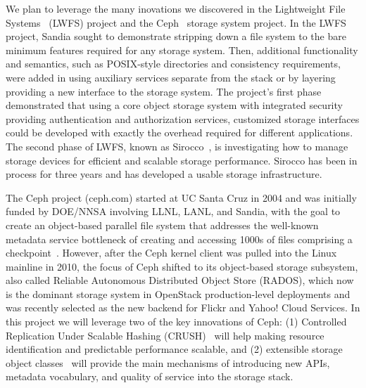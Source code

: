 We plan to leverage the many inovations we discovered in the Lightweight File
Systems~\cite{oldfield:lwfs} (LWFS) project and the Ceph~\cite{weil:osdi06} storage
system project.  In the LWFS project, Sandia sought to demonstrate stripping
down a file system to the bare minimum features required for any storage
system. Then, additional functionality and semantics, such as POSIX-style
directories and consistency requirements, were added in using auxiliary
services separate from the stack or by layering providing a new interface to
the storage system. The project's first phase demonstrated that using a core
object storage system with integrated security providing authentication and
authorization services, customized storage interfaces could be developed with
exactly the overhead required for different applications. The second phase of
LWFS, known as Sirocco~\cite{sirocco}, is investigating how to manage storage
devices for efficient and scalable storage performance.  Sirocco has been in
process for three years and has developed a usable storage infrastructure.

The Ceph project (ceph.com) started at UC Santa Cruz in 2004 and was initially
funded by DOE/NNSA involving LLNL, LANL, and Sandia, with the goal to create an
object-based parallel file system that addresses the well-known metadata
service bottleneck of creating and accessing 1000s of files comprising a
checkpoint~\cite{weil:osdi06}.  However, after the Ceph kernel client was
pulled into the Linux mainline in 2010, the focus of Ceph shifted to its
object-based storage subsystem, also called Reliable Autonomous Distributed
Object Store (RADOS), which now is the dominant storage system in OpenStack
production-level deployments and was recently selected as the new backend for
Flickr and Yahoo! Cloud Services. In this project we will leverage two of the
key innovations of Ceph: (1) Controlled Replication Under Scalable Hashing
(CRUSH)~\cite{weil:sc06} will help making resource identification and
predictable performance scalable, and (2) extensible storage object
classes~\cite{watkins:ucsctr15} will provide the main mechanisms of introducing
new APIs, metadata vocabulary, and quality of service into the storage stack.

